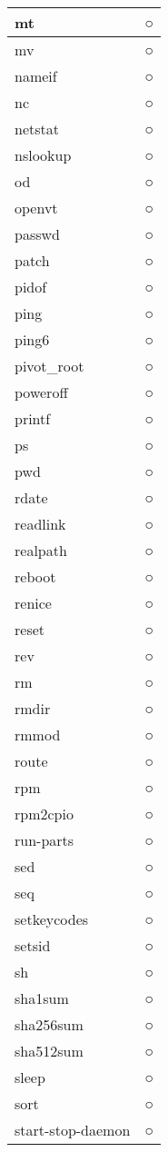 \begin{longtable}{p{40mm}p{40mm}}
mt &  ○ \\ \hline
mv &  ○ \\ \hline
nameif &  ○ \\ \hline
nc &  ○ \\ \hline
netstat & ○ \\ \hline
nslookup &  ○ \\ \hline
od &  ○ \\ \hline
openvt &  ○ \\ \hline
passwd &  ○ \\ \hline
patch & ○ \\ \hline
pidof & ○ \\ \hline
ping &  ○ \\ \hline
ping6 & ○ \\ \hline
pivot_root &  ○ \\ \hline
poweroff &  ○ \\ \hline
printf &  ○ \\ \hline
ps &  ○ \\ \hline
pwd & ○ \\ \hline
rdate & ○ \\ \hline
readlink &  ○ \\ \hline
realpath &  ○ \\ \hline
reboot &  ○ \\ \hline
renice &  ○ \\ \hline
reset & ○ \\ \hline
rev & ○ \\ \hline
rm &  ○ \\ \hline
rmdir & ○ \\ \hline
rmmod & ○ \\ \hline
route & ○ \\ \hline
rpm & ○ \\ \hline
rpm2cpio &  ○ \\ \hline
run-parts & ○ \\ \hline
sed & ○ \\ \hline
seq & ○ \\ \hline
setkeycodes & ○ \\ \hline
setsid &  ○ \\ \hline
sh &  ○ \\ \hline
sha1sum & ○ \\ \hline
sha256sum & ○ \\ \hline
sha512sum & ○ \\ \hline
sleep & ○ \\ \hline
sort &  ○ \\ \hline
start-stop-daemon & ○ \\ \hline

\end{longtable}
